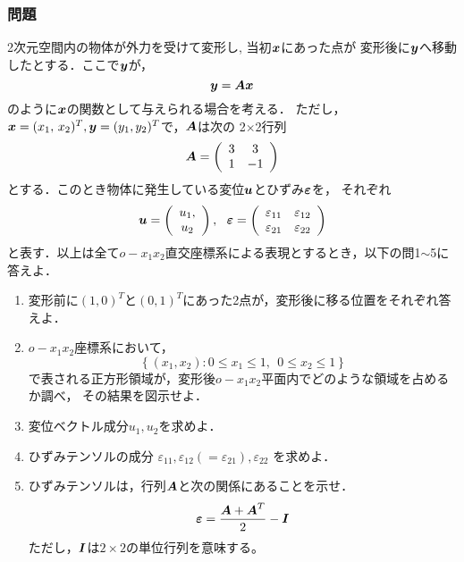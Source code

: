 \documentclass[10pt,a4j]{jarticle}
\begin{document}
\subsubsection*{問題}
2次元空間内の物体が外力を受けて変形し, 当初$\mbox{\boldmath $x$}$にあった点が
変形後に$\mbox{\boldmath $y$}$へ移動したとする．ここで$\mbox{\boldmath $y$}$が，
\begin{equation}
	\mbox{\boldmath $y$}=\mbox{\boldmath $A$}\mbox{\boldmath $x$}
	\label{eqn:disp_fld}
\end{equation}
のように$\mbox{\boldmath $x$}$の関数として与えられる場合を考える．
ただし，$\mbox{\boldmath $x$}=(x_1,\, x_2)^T, \mbox{\boldmath $y$}=(y_1, y_2)^T$で，$\mbox{\boldmath $A$}$は次の
2$\times$2行列
\begin{equation}
	\mbox{\boldmath $A$}=
	\left(
	\begin{array}{cc}
		 3 & 3 \\
	 	 1 & -1 
	\end{array}
	\label{eqn:Amat}
	\right)
\end{equation}
とする．このとき物体に発生している変位$\mbox{\boldmath $u$}$とひずみ$\mbox{\boldmath $\varepsilon$}$を，
それぞれ
\begin{equation}
	\fat{u}=\left( 
	\begin{array}{c}
	u_1,\\
	u_2 
	\end{array}
	\right)
	, \ \ 
	\fat{\varepsilon}
	=
	\left(
	\begin{array}{cc}
		\varepsilon_{11} & \varepsilon_{12} \\
		\varepsilon_{21} & \varepsilon_{22} 
	\end{array}
	\right)
\end{equation}
と表す．以上は全て$o-x_1x_2$直交座標系による表現とするとき，以下の問1$\sim$5に答えよ．
\begin{enumerate}
\item
	変形前に$(1,0)^T$と$(0,1)^T$にあった2点が，変形後に移る位置をそれぞれ答えよ．
\item
	$o-x_1x_2$座標系において，
	\[
		\left\{ (x_1,x_2):
		0\leq x_1 \leq 1, 
		\ \
		0\leq x_2 \leq 1
		\right\}
	\]
	で表される正方形領域が，変形後$o-x_1x_2$平面内でどのような領域を占めるか調べ，
	その結果を図示せよ．
\item
	変位ベクトル成分$u_1,u_2$を求めよ．
\item
	ひずみテンソルの成分
	$\varepsilon_{11},\varepsilon_{12}(=\varepsilon_{21}), \varepsilon_{22}$
	を求めよ．
\item
	ひずみテンソルは，行列$\mbox{\boldmath $A$}$と次の関係にあることを示せ．
	\begin{equation}
		\mbox{\boldmath $\varepsilon$}=\frac{\mbox{\boldmath $A$}+\mbox{\boldmath $A$}^T}{2}-\mbox{\boldmath $I$}
		\label{eqn:def_eps}
	\end{equation}
	ただし，$\mbox{\boldmath $I$}$は$2\times 2$の単位行列を意味する。
\end{enumerate}
\end{document}
